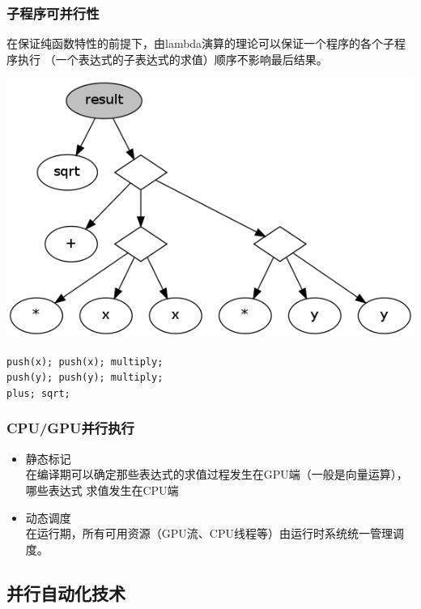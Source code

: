 \documentclass{beamer}
\begin{document}
\begin{frame}
  \frametitle{子程序可并行性}
  在保证纯函数特性的前提下，由lambda演算的理论可以保证一个程序的各个子程序执行
  （一个表达式的子表达式的求值）顺序不影响最后结果。
  \pause

  \includegraphics[scale=0.25]{images/vm-1.png}
  \pause

  \texttt{push(x); push(x); multiply;\\}\pause
  \texttt{push(y); push(y); multiply;\\}\pause
  \texttt{plus; sqrt;}
\end{frame}

\begin{frame}
  \frametitle{CPU/GPU并行执行}
  \begin{itemize}
    \item 静态标记\\
      在编译期可以确定那些表达式的求值过程发生在GPU端（一般是向量运算），哪些表达式
      求值发生在CPU端
    \item 动态调度\\
      在运行期，所有可用资源（GPU流、CPU线程等）由运行时系统统一管理调度。
  \end{itemize}
\end{frame}

\subsection{并行自动化技术}
\end{document}
